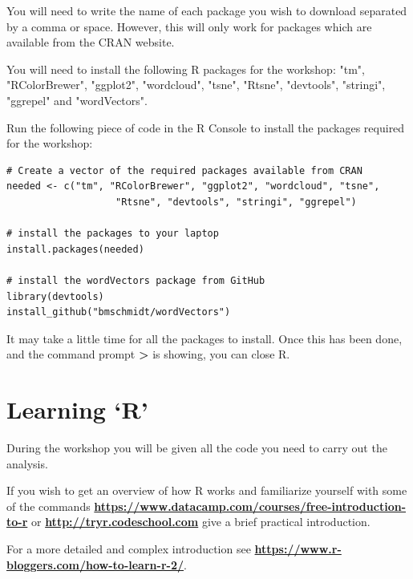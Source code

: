 \documentclass[12pt]{article}
\begin{document}
You will need to write the name of each package you wish to download separated by a comma or space. However, this will only work for packages which are available from the CRAN website.

You will need to install the following R packages for the workshop: "tm", "RColorBrewer", "ggplot2", "wordcloud", "tsne", "Rtsne", "devtools", "stringi", "ggrepel" and "wordVectors".

Run the following piece of code in the R Console to install the packages required for the workshop: 

\begin{verbatim} 
# Create a vector of the required packages available from CRAN 
needed <- c("tm", "RColorBrewer", "ggplot2", "wordcloud", "tsne", 
                   "Rtsne", "devtools", "stringi", "ggrepel")

# install the packages to your laptop
install.packages(needed)

# install the wordVectors package from GitHub
library(devtools)
install_github("bmschmidt/wordVectors")

\end{verbatim}

It may take a little time for all the packages to install. Once this has been done, and the command prompt \textbf{\textgreater} is showing, you can close R.



\section{Learning `R'}
During the workshop you will be given all the code you need to carry out the analysis. 

If you wish to get an overview of how R works and familiarize yourself with some of the commands \textbf{\url{https://www.datacamp.com/courses/free-introduction-to-r}} or \textbf{\url{http://tryr.codeschool.com}} give a brief practical introduction.

For a more detailed and complex introduction see \textbf{\url{https://www.r-bloggers.com/how-to-learn-r-2/}}.
 
\end{document}
